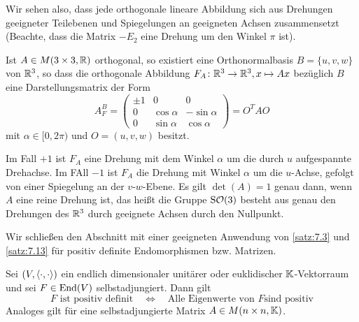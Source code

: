 Wir sehen also, dass jede orthogonale lineare Abbildung sich aus Drehungen geeigneter Teilebenen und Spiegelungen an geeigneten Achsen zusammensetzt (Beachte, dass die Matrix $-E_2$ eine Drehung um den Winkel $\pi$ ist).
\newpage
\begin{anwendung}[Der Fall $n=3$]
	\label{anw:7.18}
	Ist $A \in M(3 \times 3,\mathbb{R})$ orthogonal, so existiert eine Orthonormalbasis $B = \{u,v,w\}$ von $\mathbb{R}^3$, so dass die orthogonale Abbildung $F_A \colon \mathbb{R}^3 \rightarrow \mathbb{R}^3, x \mapsto Ax$ bezüglich $B$ eine Darstellungsmatrix der Form
	\[
		A_F^B = \begin{pmatrix}
			\pm 1 & 0 & 0 \\
		0 & \cos \alpha & -\sin \alpha \\
		0 & \sin \alpha & \cos \alpha
		\end{pmatrix} = O^T A O
	\]
	mit $\alpha \in [0,2\pi)$ und $O = (u,v,w)$ besitzt.
	
	Im Fall $+1$ ist $F_A$ eine Drehung mit dem Winkel $\alpha$ um die durch $u$ aufgespannte Drehachse.
	Im FAll $-1$ ist $F_A$ die Drehung mit Winkel $\alpha$ um die $u$-Achse, gefolgt von einer Spiegelung an der $v$-$w$-Ebene.
	Es gilt $\det(A) = 1$ genau dann, wenn $A$ eine reine Drehung ist, das heißt die Gruppe $\operatorname{S\mathcal{O}}(3)$ besteht aus genau den Drehungen des $\mathbb{R}^3$ durch geeignete Achsen durch den Nullpunkt.
\end{anwendung}

Wir schließen den Abschnitt mit einer geeigneten Anwendung von \autoref{satz:7.3} und \autoref{satz:7.13} für positiv definite Endomorphismen bzw. Matrizen.

\begin{satz}
	\label{satz:7.19}
	Sei $(V,\left\langle\cdot,\cdot\right\rangle)$ ein endlich dimensionaler unitärer oder euklidischer $\mathbb{K}$-Vektorraum und sei $F \in \operatorname{End}(V)$ selbstadjungiert.
	Dann gilt
	\[
		F \text{ ist positiv definit} \quad \Leftrightarrow \quad \text{Alle Eigenwerte von } F \text{sind positiv}
	\]
	Analoges gilt für eine selbstadjungierte Matrix $A \in M(n \times n, \mathbb{K})$.
\end{satz}

